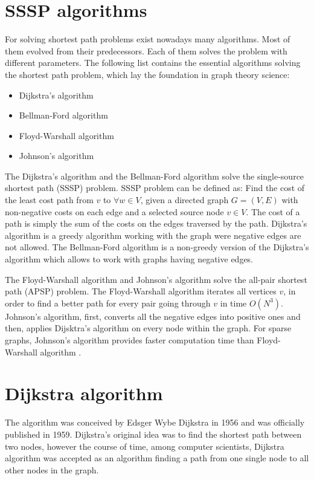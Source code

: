 \documentclass[thesis=M,english]{FITthesis}[2012/10/20]
\begin{document}
\section{SSSP algorithms}
For solving shortest path problems exist nowadays many algorithms. Most of them evolved from their predecessors. Each of them solves the problem with different parameters. 
The following list contains the essential algorithms solving the shortest path problem, which lay the foundation in graph theory science:
\begin{itemize}
\item Dijkstra's algorithm
\item Bellman-Ford algorithm
\item Floyd-Warshall algorithm
\item Johnson's algorithm 
\end{itemize}

The Dijkstra's algorithm \cite{Dijkstra59} and the Bellman-Ford algorithm \cite{Bellman58, FordFulkerson62} solve the single-source shortest path (SSSP) problem. SSSP problem can be defined as: Find the cost of the least cost path from $v$ to $\forall w \in V$, given a directed graph $G = (V,E)$ with non-negative costs on each edge and a selected source node $v \in V$. The cost of a path is simply the sum of the costs on the edges traversed by the path. Dijkstra's algorithm is a greedy algorithm working with the graph were negative edges are not allowed. The Bellman-Ford algorithm is a non-greedy version of the Dijkstra's algorithm which allows to work with graphs having negative edges.

The Floyd-Warshall algorithm \cite{Warshall62, Floyd56} and Johnson's algorithm \cite{Johnson77} solve the all-pair shortest path (APSP) problem. The Floyd-Warshall algorithm iterates all vertices $v$, in order to find a better path for every pair going through $v$ in time $O(N^3)$. Johnson's algorithm, first, converts all the negative edges into positive ones and then, applies Dijsktra's algorithm on every node within the graph. 
For sparse graphs, Johnson's algorithm provides faster computation time than Floyd-Warshall algorithm \cite{Cormen01}.


\section{Dijkstra algorithm}
\label{sec:dijsktra}
The algorithm was conceived by Edsger Wybe Dijkstra in 1956 and was officially published in 1959. Dijkstra's original idea was to find the shortest path between two nodes, however the course of time, among computer scientists, Dijkstra algorithm was accepted as an algorithm finding a path from one single node to all other nodes in the graph. 
\end{document}
